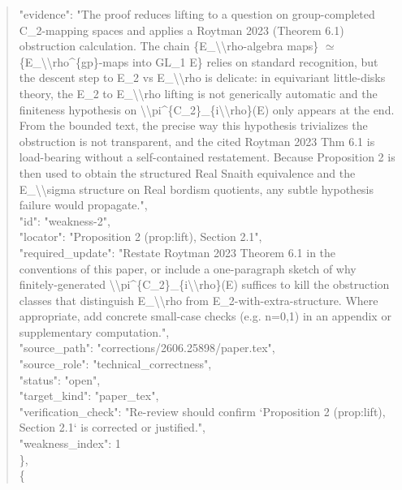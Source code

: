 \documentclass[11pt]{article}
\begin{document}
\begin{quote}
      "evidence": "The proof reduces lifting to a question on group-completed C\_2-mapping spaces and applies a Roytman 2023 (Theorem 6.1) obstruction calculation. The chain \{E\_\textbackslash{}\textbackslash{}rho-algebra maps\} \ensuremath{\simeq} \{E\_\textbackslash{}\textbackslash{}rho\^{}\{gp\}-maps into GL\_1 E\} relies on standard recognition, but the descent step to E\_2 vs E\_\textbackslash{}\textbackslash{}rho is delicate: in equivariant little-disks theory, the E\_2 to E\_\textbackslash{}\textbackslash{}rho lifting is not generically automatic and the finiteness hypothesis on \textbackslash{}\textbackslash{}pi\^{}\{C\_2\}\_\{i\textbackslash{}\textbackslash{}rho\}(E) only appears at the end. From the bounded text, the precise way this hypothesis trivializes the obstruction is not transparent, and the cited Roytman 2023 Thm 6.1 is load-bearing without a self-contained restatement. Because Proposition 2 is then used to obtain the structured Real Snaith equivalence and the E\_\textbackslash{}\textbackslash{}sigma structure on Real bordism quotients, any subtle hypothesis failure would propagate.",\\
      "id": "weakness-2",\\
      "locator": "Proposition 2 (prop:lift), Section 2.1",\\
      "required\_update": "Restate Roytman 2023 Theorem 6.1 in the conventions of this paper, or include a one-paragraph sketch of why finitely-generated \textbackslash{}\textbackslash{}pi\^{}\{C\_2\}\_\{i\textbackslash{}\textbackslash{}rho\}(E) suffices to kill the obstruction classes that distinguish E\_\textbackslash{}\textbackslash{}rho from E\_2-with-extra-structure. Where appropriate, add concrete small-case checks (e.g. n=0,1) in an appendix or supplementary computation.",\\
      "source\_path": "corrections/2606.25898/paper.tex",\\
      "source\_role": "technical\_correctness",\\
      "status": "open",\\
      "target\_kind": "paper\_tex",\\
      "verification\_check": "Re-review should confirm `Proposition 2 (prop:lift), Section 2.1` is corrected or justified.",\\
      "weakness\_index": 1\\
    \},\\
    \{\\

\end{quote}
\end{document}
